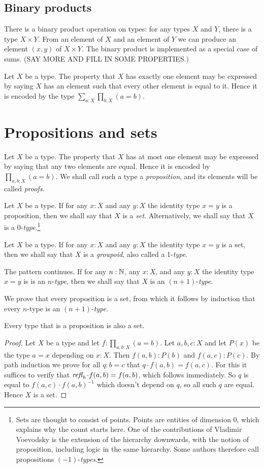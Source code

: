 \subsection{Binary products}
\label{sec:binprod-types}
There is a binary product operation on types: for any types $X$ and $Y$, there is a type $X \times Y$.  From an element of $X$ and an element of
$Y$ we can produce an element $(x,y)$ of $X \times Y$.  The binary product is implemented as a special case of sums.  (SAY MORE AND FILL IN SOME
PROPERTIES.)

Let $X$ be a type.  The property that $X$ has exactly one element may be expressed by saying $X$ has an element such that every other element is
equal to it.  Hence it is encoded by the type $\sum_{a:X} \prod_{b:X} (a=b)$.

\section{Propositions and sets}
\label{sec:propositions-and-sets}

Let $X$ be a type.  The property that $X$ has at most one element may be expressed by saying that any two elements are equal. Hence it is encoded
by $\prod_{a,b:X} (a=b)$.  We shall call such a type a \emph{proposition}, and its elements will be called \emph{proofs}.

Let $X$ be a type.  If for any $x:X$ and any $y:X$ the identity type $x=y$ is a proposition, then we shall say that $X$ is a \emph{set}.
Alternatively, we shall say that $X$ is a 0-\emph{type}.\footnote{%
Sets are thought to consist of points. Points are entities of dimension 0, 
which explains why the count starts here.
One of the contributions of Vladimir Voevodsky is the extension of
the hierarchy downwards, with the notion of proposition,
including logic in the same hierarchy.
Some authors therefore call propositions $(-1)$-\emph{types}.} 

Let $X$ be a type.  If for any $x:X$ and any $y:X$ the identity type $x=y$ is a set, 
 then we shall say that $X$ is a \emph{groupoid}, also called a 1-\emph{type}.

The pattern continues.  If for any $n:\mathbb{N}$, any $x:X$, and any $y:X$ 
the identity type $x=y$ is is an $n$-\emph{type}, 
then we shall say that $X$ is an $(n+1)$-\emph{type}.

We prove that every proposition is a set, from which it follows
by induction that every $n$-type is an $(n+1)$-\emph{type}.

\begin{lemma}\label{lem:prop_is_set}
Every type that is a proposition is also a set.
\end{lemma}
\begin{proof}
Let $X$ be a type and let $f: \prod_{a,b:X} (a=b)$. Let $a,b,c : X$ and
let $P(x)$ be the type $a=x$ depending on $x:X$. Then
$f(a,b):P(b)$ and $f(a,c):P(c)$. By path induction we prove for
all $q:b=c$ that $q\cdot f(a,b) = f(a,c)$. For this it suffices to
verify that $\mathop{{\it refl}_{b}} \cdot f(a,b) = f(a,b)$, which follows immediately.
So $q$ is equal to $f(a,c)\cdot f(a,b)^{-1}$ which doesn't
depend on $q$, so all such $q$ are equal. Hence $X$ is a set.
\end{proof}

